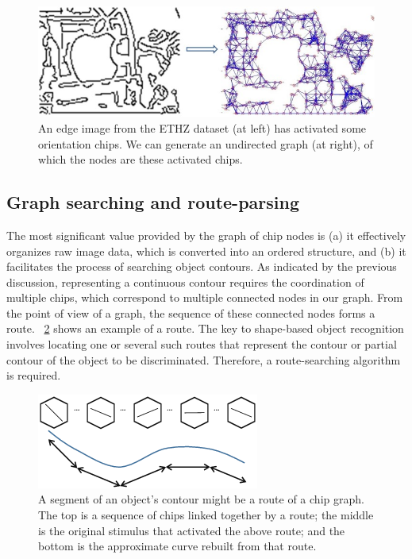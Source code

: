 \documentclass{article}
\begin{document}
\begin{figure}[!t]
\centering
\includegraphics[width=0.85\linewidth]{images/fig8.jpg}
\caption{An edge image from the ETHZ dataset (at left) has activated some orientation chips. 
We can generate an undirected graph (at right), of which the nodes are these activated chips.}
\label{fig:8}
\end{figure}

\subsection{Graph searching and route-parsing}

The most significant value provided by the graph of chip nodes is 
(a) it effectively organizes raw image data, which is converted into an ordered structure, 
and (b) it facilitates the process of searching object contours. 
As indicated by the previous discussion, 
representing a continuous contour requires the coordination of multiple chips, 
which correspond to multiple connected nodes in our graph.
From the point of view of a graph, the sequence of these connected nodes forms a route.
\figurename~\ref{fig:9} shows an example of a route. 
The key to shape-based object recognition involves locating one or several such routes
that represent the contour or partial contour of the object to be discriminated.
Therefore, a route-searching algorithm is required.

\begin{figure}[!t]
\centering
\includegraphics[width=0.5\linewidth]{images/fig9.png}
\caption{A segment of an object's contour might be a route of a chip graph. 
The top is a sequence of chips linked together by a route; 
the middle is the original stimulus that activated the above route; 
and the bottom is the approximate curve rebuilt from that route. }
\label{fig:9}
\end{figure}
\end{document}
